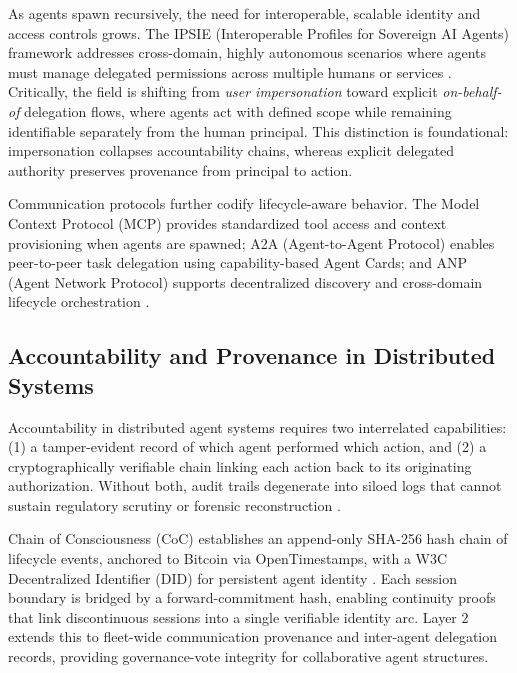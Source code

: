 As agents spawn recursively, the need for interoperable, scalable identity and access controls grows. The IPSIE (Interoperable Profiles for Sovereign AI Agents) framework addresses cross-domain, highly autonomous scenarios where agents must manage delegated permissions across multiple humans or services \cite{ipsiene2025}. Critically, the field is shifting from \textit{user impersonation} toward explicit \textit{on-behalf-of} delegation flows, where agents act with defined scope while remaining identifiable separately from the human principal. This distinction is foundational: impersonation collapses accountability chains, whereas explicit delegated authority preserves provenance from principal to action.

Communication protocols further codify lifecycle-aware behavior. The Model Context Protocol (MCP) provides standardized tool access and context provisioning when agents are spawned; A2A (Agent-to-Agent Protocol) enables peer-to-peer task delegation using capability-based Agent Cards; and ANP (Agent Network Protocol) supports decentralized discovery and cross-domain lifecycle orchestration \cite{protocols2025}.

\subsection{Accountability and Provenance in Distributed Systems}

Accountability in distributed agent systems requires two interrelated capabilities: (1) a tamper-evident record of which agent performed which action, and (2) a cryptographically verifiable chain linking each action back to its originating authorization. Without both, audit trails degenerate into siloed logs that cannot sustain regulatory scrutiny or forensic reconstruction \cite{vap2026, trusttrack2025}.

Chain of Consciousness (CoC) establishes an append-only SHA-256 hash chain of lifecycle events, anchored to Bitcoin via OpenTimestamps, with a W3C Decentralized Identifier (DID) for persistent agent identity \cite{chainofconsciousness2026}. Each session boundary is bridged by a forward-commitment hash, enabling continuity proofs that link discontinuous sessions into a single verifiable identity arc. Layer 2 extends this to fleet-wide communication provenance and inter-agent delegation records, providing governance-vote integrity for collaborative agent structures.

